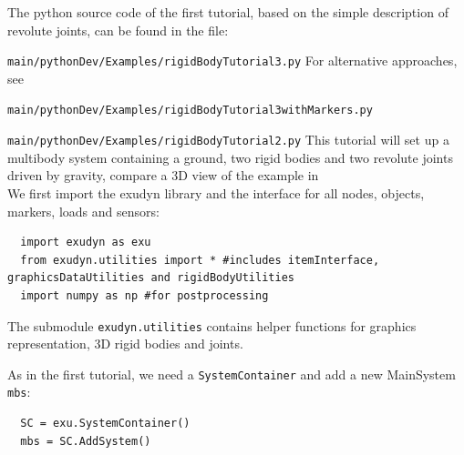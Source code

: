 \newpage
{}
The python source code of the first tutorial, based on the simple description of revolute joints, can be found in the file:
\bi
  \item[] \texttt{main/pythonDev/Examples/rigidBodyTutorial3.py}
\ei
For alternative approaches, see
\bi
  \item[] \texttt{main/pythonDev/Examples/rigidBodyTutorial3withMarkers.py}
  \item[] \texttt{main/pythonDev/Examples/rigidBodyTutorial2.py}
\ei
This tutorial will set up a multibody system containing a ground, two rigid bodies and two revolute joints driven by gravity, compare a 3D view of the example in  
\horizontalRuler\\
\noindent We first import the exudyn library and the interface for all nodes, objects, markers, loads and sensors:
\pythonstyle\begin{lstlisting}
  import exudyn as exu
  from exudyn.utilities import * #includes itemInterface, graphicsDataUtilities and rigidBodyUtilities
  import numpy as np #for postprocessing
\end{lstlisting}
The submodule \texttt{exudyn.utilities} contains helper functions for graphics representation, 3D rigid bodies and joints.

\noindent As in the first tutorial, we need a \texttt{SystemContainer} and add a new MainSystem \texttt{mbs}:
\pythonstyle\begin{lstlisting}
  SC = exu.SystemContainer()
  mbs = SC.AddSystem()
\end{lstlisting}

